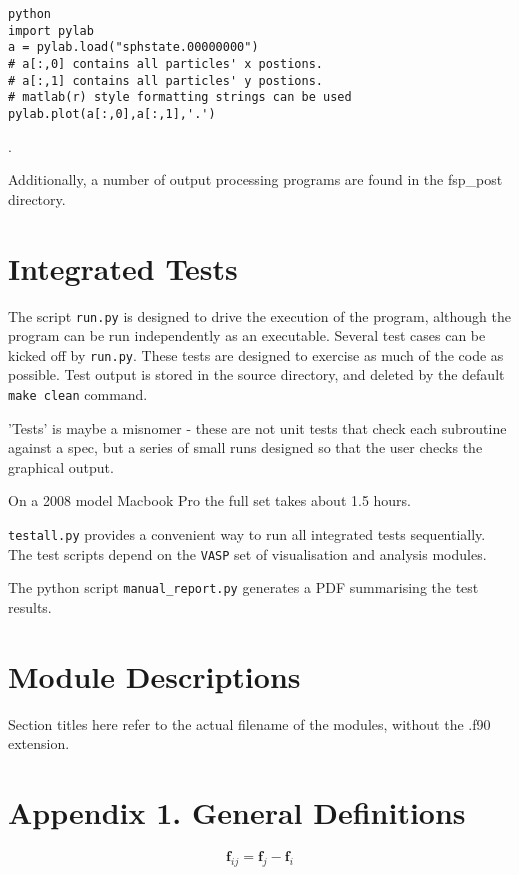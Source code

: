 \begin{verbatim}
python
import pylab
a = pylab.load("sphstate.00000000")
# a[:,0] contains all particles' x postions.
# a[:,1] contains all particles' y postions.
# matlab(r) style formatting strings can be used
pylab.plot(a[:,0],a[:,1],'.')
\end{verbatim}.

Additionally, a number of output processing programs are found in the fsp\_post
directory.

\section{Integrated Tests}
The script \texttt{run.py} is designed to drive the execution of the program,
although the program can be run independently as an executable.  Several test
cases can be kicked off by \texttt{run.py}. These tests are designed to
exercise as much of the code as possible. Test output is stored in the source
directory, and deleted by the default \texttt{make clean} command.

'Tests' is maybe a misnomer - these are not unit tests that check each
subroutine against a spec, but a series of small runs designed so that the user
checks the graphical output.

On a 2008 model Macbook Pro the full set takes about 1.5 hours.

\texttt{testall.py} provides a convenient way to run all integrated tests
sequentially. The test scripts depend on the \texttt{VASP} set of visualisation
and analysis modules.

The python script \texttt{manual\_report.py} generates a PDF summarising the
test results.

\section{Module Descriptions}
Section titles here refer to the actual filename of the modules, without the
.f90 extension.








\appendix
\section{Appendix 1. General Definitions}
\begin{equation}
\label{difference}
 \mathbold{f}_{ij}  = \mathbold{f}_j - \mathbold{f}_i
\end{equation}



